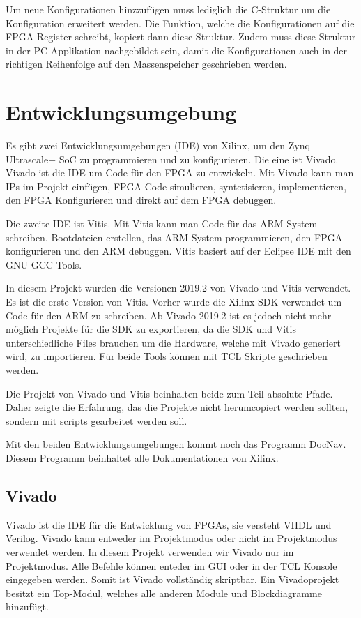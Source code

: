 \documentclass{article}
\begin{document}
Um neue Konfigurationen hinzzufügen muss lediglich die C-Struktur um dîe Konfiguration erweitert werden. Die Funktion, welche die Konfigurationen auf die FPGA-Register schreibt, kopiert dann diese Struktur. Zudem muss diese Struktur in der PC-Applikation nachgebildet sein, damit die Konfigurationen auch in der richtigen Reihenfolge auf den Massenspeicher geschrieben werden.

\section{Entwicklungsumgebung}
Es gibt zwei Entwicklungsumgebungen (IDE) von Xilinx, um den Zynq Ultrascale+ SoC zu programmieren und zu konfigurieren. Die eine ist Vivado. Vivado ist die IDE um Code für den FPGA zu entwickeln. Mit Vivado kann man IPs im Projekt einfügen, FPGA Code simulieren, syntetisieren, implementieren, den FPGA Konfigurieren und direkt auf dem FPGA debuggen.

Die zweite IDE ist Vitis. Mit Vitis kann man Code für das ARM-System schreiben, Bootdateien erstellen, das ARM-System programmieren, den FPGA konfigurieren und den ARM debuggen. Vitis basiert auf der Eclipse IDE mit den GNU GCC Tools.

In diesem Projekt wurden die Versionen 2019.2 von Vivado und Vitis verwendet. Es ist die erste Version von Vitis. Vorher wurde die Xilinx SDK verwendet um Code für den ARM zu schreiben. Ab Vivado 2019.2 ist es jedoch nicht mehr möglich Projekte für die SDK zu exportieren, da die SDK und Vitis unterschiedliche Files brauchen um die Hardware, welche mit Vivado generiert wird, zu importieren. Für beide Tools können mit TCL Skripte geschrieben werden.

Die Projekt von Vivado und Vitis beinhalten beide zum Teil absolute Pfade. Daher zeigte die Erfahrung, das die Projekte nicht herumcopiert werden sollten, sondern mit scripts gearbeitet werden soll. 

Mit den beiden Entwicklungsumgebungen kommt noch das Programm DocNav. Diesem Programm beinhaltet alle Dokumentationen von Xilinx.

\subsection{Vivado}
Vivado ist die IDE für die Entwicklung von FPGAs, sie versteht VHDL und Verilog. Vivado kann entweder im Projektmodus oder nicht im Projektmodus verwendet werden. In diesem Projekt verwenden wir Vivado nur im Projektmodus. Alle Befehle können enteder im GUI oder in der TCL Konsole eingegeben werden. Somit ist Vivado vollständig skriptbar. Ein Vivadoprojekt besitzt ein Top-Modul, welches alle anderen Module und Blockdiagramme hinzufügt.
\end{document}
